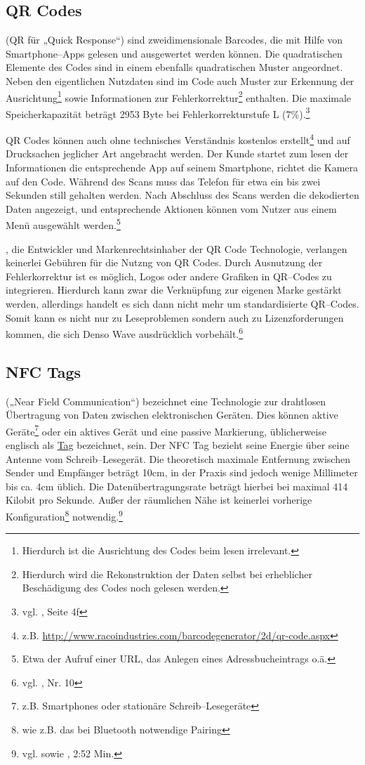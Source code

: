 \subsection{QR Codes} %
\label{sub:qr_codes}
 (QR für „Quick Response“) sind zweidimensionale Barcodes, die mit Hilfe von Smartphone–Apps gelesen und ausgewertet werden können. Die quadratischen Elemente des Codes sind in einem ebenfalls quadratischen Muster angeordnet. Neben den eigentlichen Nutzdaten sind im Code auch Muster zur Erkennung der Ausrichtung\footnote{Hierdurch ist die Ausrichtung des Codes beim lesen irrelevant.} sowie Informationen zur Fehlerkorrektur\footnote{Hierdurch wird die Rekonstruktion der Daten selbst bei erheblicher Beschädigung des Codes noch gelesen werden.} enthalten. Die maximale Speicherkapazität beträgt 2953 Byte bei Fehlerkorrekturstufe L (7\%).\footnote{vgl. \cite{iso18004}, Seite 4f}

QR Codes können auch ohne technisches Verständnis kostenlos erstellt\footnote{z.B. \url{http://www.racoindustries.com/barcodegenerator/2d/qr-code.aspx}} und auf Drucksachen jeglicher Art angebracht werden. Der Kunde startet zum lesen der Informationen die entsprechende App auf seinem Smartphone, richtet die Kamera auf den Code. Während des Scans muss das Telefon für etwa ein bis zwei Sekunden still gehalten werden. Nach Abschluss des Scans werden die dekodierten Daten angezeigt, und entsprechende Aktionen können vom Nutzer aus einem Menü ausgewählt werden.\footnote{Etwa der Aufruf einer URL, das Anlegen eines Adressbucheintrags o.ä.} 

, die Entwickler und Markenrechtsinhaber der QR Code Technologie,  verlangen keinerlei Gebühren für die Nutzng von QR Codes. Durch Ausnutzung der Fehlerkorrektur ist es möglich, Logos oder andere Grafiken in QR–Codes zu integrieren. Hierdurch kann zwar die Verknüpfung zur eigenen Marke gestärkt werden, allerdings handelt es sich dann nicht mehr um standardisierte QR–Codes. Somit kann es nicht nur zu Leseproblemen sondern auch zu Lizenzforderungen kommen, die sich Denso Wave ausdrücklich vorbehält.\footnote{vgl. \cite{denso-faq}, Nr. 10}

\subsection{NFC Tags} %
\label{sub:nfc_tags}
 („Near Field Communication“) bezeichnet eine Technologie zur drahtlosen Übertragung von Daten zwischen elektronischen Geräten. Dies können aktive Geräte\footnote{z.B. Smartphones oder stationäre Schreib–Lesegeräte} oder ein aktives Gerät und eine passive Markierung, üblicherweise englisch als \url{Tag} bezeichnet, sein. Der NFC Tag bezieht seine Energie über seine Antenne vom Schreib–Lesegerät. Die theoretisch maximale Entfernung zwischen Sender und Empfänger beträgt 10cm, in der Praxis sind jedoch wenige Millimeter bis ca. 4cm üblich. Die Datenübertragungsrate beträgt hierbei bei maximal 414 Kilobit pro Sekunde. Außer der räumlichen Nähe ist keinerlei vorherige Konfiguration\footnote{wie z.B. das bei Bluetooth notwendige Pairing} notwendig.\footnote{vgl. \cite{nfcforum:about} sowie \cite{google:nfc}, 2:52 Min.}

